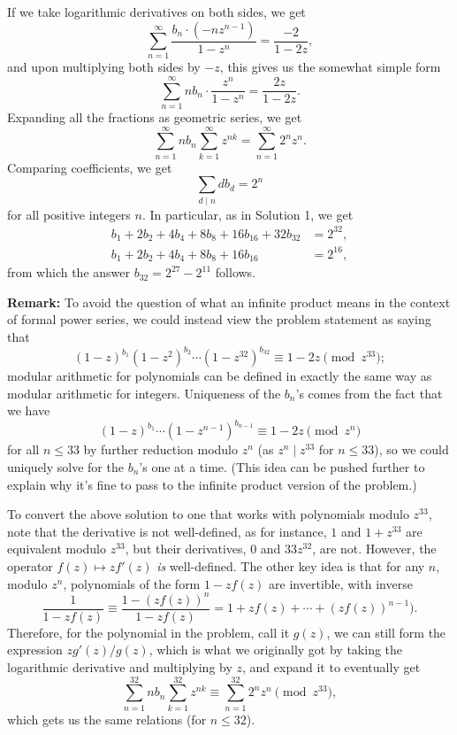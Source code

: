 \begin{enumerate}
 If we take logarithmic derivatives on both sides, we get
 \[\sum_{n = 1}^{\infty}\frac{b_n\cdot (-nz^{n - 1})}{1 - z^n} = \frac{-2}{1 - 2z},\]and upon multiplying both sides by $-z$, this gives us the somewhat simple form
 \[\sum_{n = 1}^{\infty} nb_n\cdot\frac{z^n}{1 - z^n} = \frac{2z}{1 - 2z}.\]Expanding all the fractions as geometric series, we get
 \[\sum_{n = 1}^{\infty} nb_n\sum_{k = 1}^{\infty} z^{nk} = \sum_{n = 1}^{\infty} 2^nz^n.\]Comparing coefficients, we get
 \[\sum_{d\mid n} db_d = 2^n\]for all positive integers $n$. In particular, as in Solution 1, we get
 \[\begin{array}{ll} b_1 + 2b_2 + 4b_4 + 8b_8 + 16b_{16} + 32b_{32} &= 2^{32}, \\ b_1 + 2b_2 + 4b_4 + 8b_8 + 16b_{16}\phantom{ + 32b_{32}} &= 2^{16}, \end{array}\]from which the answer $b_{32} = 2^{27} - 2^{11}$ follows.

 \textbf{Remark:} To avoid the question of what an infinite product means in the context of formal power series, we could instead view the problem statement as saying that
 \[(1 - z)^{b_1}(1 - z^2)^{b_2}\cdots (1 - z^{32})^{b_{32}}\equiv 1 - 2z\pmod{z^{33}};\]modular arithmetic for polynomials can be defined in exactly the same way as modular arithmetic for integers. Uniqueness of the $b_n$'s comes from the fact that we have
 \[(1 - z)^{b_1}\cdots (1 - z^{n - 1})^{b_{n - 1}}\equiv 1 - 2z\pmod{z^n}\]for all $n\leq 33$ by further reduction modulo $z^n$ (as $z^n\mid z^{33}$ for $n\leq 33$), so we could uniquely solve for the $b_n$'s one at a time. (This idea can be pushed further to explain why it's fine to pass to the infinite product version of the problem.)

 To convert the above solution to one that works with polynomials modulo $z^{33}$, note that the derivative is not well-defined, as for instance, $1$ and $1 + z^{33}$ are equivalent modulo $z^{33}$, but their derivatives, $0$ and $33z^{32}$, are not. However, the operator $f(z)\mapsto zf'(z)$ \textit{is} well-defined. The other key idea is that for any $n$, modulo $z^n$, polynomials of the form $1 - zf(z)$ are invertible, with inverse
 \[\frac{1}{1 - zf(z)}\equiv\frac{1 - (zf(z))^n}{1 - zf(z)} = 1 + zf(z) + \cdots + (zf(z))^{n - 1}).\]Therefore, for the polynomial in the problem, call it $g(z)$, we can still form the expression $zg'(z)/g(z)$, which is what we originally got by taking the logarithmic derivative and multiplying by $z$, and expand it to eventually get
 \[\sum_{n = 1}^{32} nb_n\sum_{k = 1}^{32} z^{nk}\equiv\sum_{n = 1}^{32} 2^nz^n\pmod{z^{33}},\]which gets us the same relations (for $n\leq 32$).


\end{enumerate}
